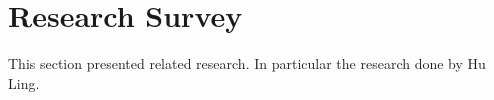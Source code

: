 \section{Research Survey}\label{sec-survey}
This section presented related research. In particular the research done
by Hu Ling.